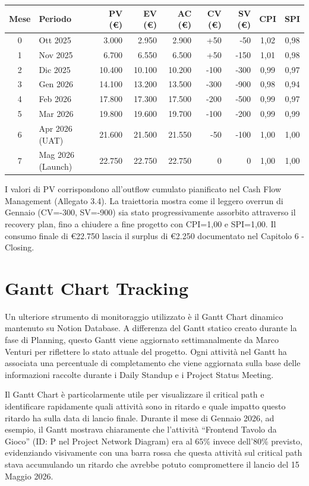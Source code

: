 \begin{center}
\footnotesize
\begin{tabular}{clrrrrrcc}
\toprule
Mese & Periodo & PV (€) & EV (€) & AC (€) & CV (€) & SV (€) & CPI & SPI \\
\midrule
0 & Ott 2025 & 3.000 & 2.950 & 2.900 & +50 & -50 & 1,02 & 0,98 \\
1 & Nov 2025 & 6.700 & 6.550 & 6.500 & +50 & -150 & 1,01 & 0,98 \\
2 & Dic 2025 & 10.400 & 10.100 & 10.200 & -100 & -300 & 0,99 & 0,97 \\
3 & Gen 2026 & 14.100 & 13.200 & 13.500 & -300 & -900 & 0,98 & 0,94 \\
4 & Feb 2026 & 17.800 & 17.300 & 17.500 & -200 & -500 & 0,99 & 0,97 \\
5 & Mar 2026 & 19.800 & 19.600 & 19.700 & -100 & -200 & 0,99 & 0,99 \\
6 & Apr 2026 (UAT) & 21.600 & 21.500 & 21.550 & -50 & -100 & 1,00 & 1,00 \\
7 & Mag 2026 (Launch) & 22.750 & 22.750 & 22.750 & 0 & 0 & 1,00 & 1,00 \\
\bottomrule
\end{tabular}
\end{center}

I valori di PV corrispondono all'outflow cumulato pianificato nel Cash Flow Management (Allegato 3.4). La traiettoria mostra come il leggero overrun di Gennaio (CV=-300, SV=-900) sia stato progressivamente assorbito attraverso il recovery plan, fino a chiudere a fine progetto con CPI=1,00 e SPI=1,00. Il consumo finale di €22.750 lascia il surplus di €2.250 documentato nel Capitolo 6 - Closing.

\section{Gantt Chart Tracking}

Un ulteriore strumento di monitoraggio utilizzato è il Gantt Chart dinamico mantenuto su Notion Database. A differenza del Gantt statico creato durante la fase di Planning, questo Gantt viene aggiornato settimanalmente da Marco Venturi per riflettere lo stato attuale del progetto. Ogni attività nel Gantt ha associata una percentuale di completamento che viene aggiornata sulla base delle informazioni raccolte durante i Daily Standup e i Project Status Meeting.

Il Gantt Chart è particolarmente utile per visualizzare il critical path e identificare rapidamente quali attività sono in ritardo e quale impatto questo ritardo ha sulla data di lancio finale. Durante il mese di Gennaio 2026, ad esempio, il Gantt mostrava chiaramente che l'attività ``Frontend Tavolo da Gioco'' (ID: P nel Project Network Diagram) era al 65\% invece dell'80\% previsto, evidenziando visivamente con una barra rossa che questa attività sul critical path stava accumulando un ritardo che avrebbe potuto compromettere il lancio del 15 Maggio 2026.

